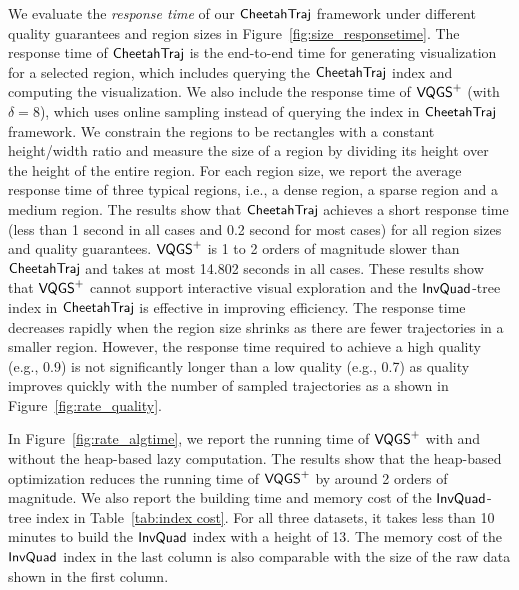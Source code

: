   


We evaluate the \textit{response time} of our $\mathsf{CheetahTraj}$ framework under different quality guarantees and region sizes in Figure~\ref{fig:size_responsetime}.
The response time of $\mathsf{CheetahTraj}$ is the end-to-end time for generating visualization for a selected region, which includes querying the $\mathsf{CheetahTraj}$ index and computing the visualization.
We also include the response time of $\mathsf{VQGS}^+$ (with $\delta\!=\!8$), which uses online sampling instead of querying the index in $\mathsf{CheetahTraj}$ framework.
We constrain the regions to be rectangles with a constant height/width ratio and measure the size of a region by dividing its height over the height of the entire region.
For each region size, we report the average response time of three typical regions, i.e., a dense region, a sparse region and a medium region.
The results show that $\mathsf{CheetahTraj}$ achieves a short response time (less than 1 second in all cases and 0.2 second for most cases) for all region sizes and quality guarantees. $\mathsf{VQGS}^+$ is 1 to 2 orders of magnitude slower than $\mathsf{CheetahTraj}$ and takes at most 14.802 seconds in all cases. These results show that $\mathsf{VQGS}^+$ cannot support interactive visual exploration and the $\mathsf{InvQuad}$-tree index in $\mathsf{CheetahTraj}$ is effective in improving efficiency.
The response time decreases rapidly when the region size shrinks as there are fewer trajectories in a smaller region.
However, the response time required to achieve a high quality (e.g., 0.9) is not significantly longer than a low quality (e.g., 0.7) as quality improves quickly with the number of sampled trajectories as a shown in Figure~\ref{fig:rate_quality}.





 In Figure~\ref{fig:rate_algtime}, we report the running time of $\mathsf{VQGS}^+$  with and without the heap-based lazy computation.
The results show that the heap-based optimization reduces the running time of $\mathsf{VQGS}^+$ by around 2 orders of magnitude. We also report the building time and memory cost of the $\mathsf{InvQuad}$-tree index in Table~\ref{tab:index cost}.
For all three datasets, it takes less than 10 minutes to build the $\mathsf{InvQuad}$ index with a height of 13.
The memory cost of the $\mathsf{InvQuad}$ index in the last column is also comparable with the size of the raw data shown in the first column.


